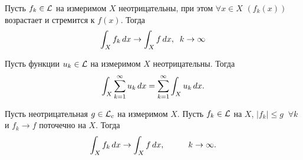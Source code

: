 
\begin{to_thr}
\label{5.84}
    Пусть $f_k \in \mathcal{L}$ на измеримом $X$ неотрицательны, при этом $\forall x \in X$ $(f_k(x))$ возрастает и стремится к $f(x)$. Тогда
    $$
        \int_X f_k \, d x \to \int_X f \, d x, \; \; k \to \infty
    $$
 \end{to_thr}


\begin{to_thr}
\label{5.85}
    Пусть функции $u_k \in \mathcal{L}$ на измеримом $X$ неотрицательны. Тогда
    $$
        \int_X \sum_{k=1}^{\infty} u_k \, d x = \sum_{k=1}^{\infty} \int_X u_k \, d x.
    $$
\end{to_thr}


\begin{to_thr}
\label{5.87}
    Пусть неотрицательная $g \in \mathcal{L}_c$ на измеримом $X$. Пусть $f_k \in \mathcal{L}$ на $X$, $|f_k| \leq g \; \; \forall k$ и $f_k \to f$ поточечно на $X$. Тогда
    $$
        \int_X f_k \, d x \to \int_X f \, d x, \hspace{1cm} k \to \infty.
    $$
\end{to_thr}